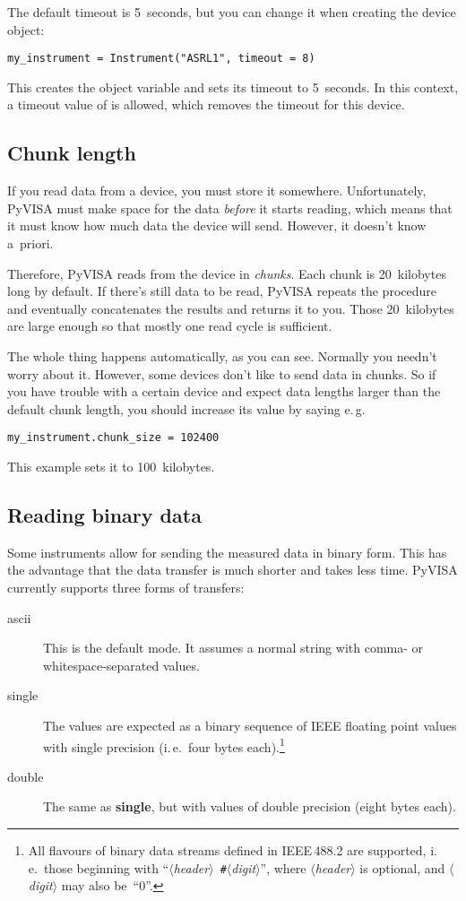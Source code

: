 \documentclass{howto}
\begin{document}
The default timeout is 5~seconds, but you can change it when creating the
device object:
\begin{verbatim}
my_instrument = Instrument("ASRL1", timeout = 8)
\end{verbatim}
This creates the object variable  and sets its timeout to
5~seconds.  In this context, a timeout value of  is allowed, which
removes the timeout for this device.


\subsection{Chunk length}
\label{sec:chunk-length}

If you read data from a device, you must store it somewhere.  Unfortunately,
PyVISA must make space for the data \emph{before} it starts reading, which
means that it must know how much data the device will send.  However, it
doesn't know a~priori.

Therefore, PyVISA reads from the device in \emph{chunks}.  Each chunk is
20~kilobytes long by default.  If there's still data to be read, PyVISA repeats
the procedure and eventually concatenates the results and returns it to you.
Those 20~kilobytes are large enough so that mostly one read cycle is
sufficient.

The whole thing happens automatically, as you can see.  Normally you needn't
worry about it.  However, some devices don't like to send data in chunks.  So
if you have trouble with a certain device and expect data lengths larger than
the default chunk length, you should increase its value by saying e.\,g.
\begin{verbatim}
my_instrument.chunk_size = 102400
\end{verbatim}
This example sets it to 100~kilobytes.


\subsection{Reading binary data}
\label{sec:reading-binary-data}

Some instruments allow for sending the measured data in binary form.  This has
the advantage that the data transfer is much shorter and takes less time.
PyVISA currently supports three forms of transfers:

\begin{description}
\item[ascii] This is the default mode.  It assumes a normal string with comma-
  or whitespace-separated values.
\item[single] The values are expected as a binary sequence of IEEE floating
  point values with single precision (i.\,e.\ four bytes each).\footnote{All
    flavours of binary data streams defined in IEEE\,488.2 are supported,
    i.\,e.\ those beginning with
    ``\textit{$\langle$header$\rangle$}~\texttt{\#}\textit{$\langle$digit$\rangle$}'',
    where \textit{$\langle$header$\rangle$} is optional, and
    \textit{$\langle$digit$\rangle$} may also be~``0''.}
\item[double] The same as \textbf{single}, but with values of double precision
  (eight bytes each).
\end{description}
\end{document}
